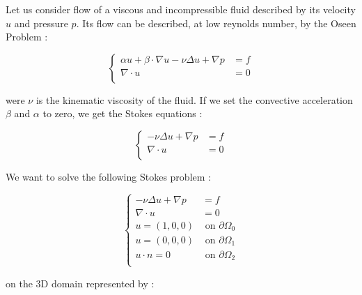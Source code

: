 %
%
%
%
%


Let us consider flow of a viscous and incompressible fluid described by its velocity $u$
and pressure $p$. Its flow can be described, at low reynolds number, by the Oseen Problem :

\begin{equation} \label{eqn-oseen}
\left\{
\begin{array}{lc}
\displaystyle \alpha u + \beta \cdot \nabla u - \nu \Delta u +
\nabla p & = f \\
\displaystyle \nabla \cdot u & = 0  \\
\end{array}
\right.
\end{equation}

were $\nu$ is the kinematic viscosity of the fluid. If we set the convective
acceleration $\beta$ and $\alpha$ to zero, we get the Stokes equations
 :

\begin{equation} \label{eqn-stokes}
\left\{
\begin{array}{lc}
- \nu \Delta u+
\nabla p & = f \\
\displaystyle \nabla \cdot u & = 0  \\
\end{array}
\right.
\end{equation}

We want to solve the following Stokes problem :

\begin{equation} \label{eqn-stokes}
\left\{
\begin{array}{lc}
\displaystyle - \nu \Delta u+
\nabla p & = f \\
\displaystyle \nabla \cdot u & = 0  \\
u = (1, 0, 0) & \mbox{ on } \partial \Omega_0 \\
u = (0, 0, 0) & \mbox{ on } \partial \Omega_1  \\
u \cdot n = 0 & \mbox { on } \partial \Omega_2\\
\end{array}
\right.
\end{equation}

on the 3D domain represented by :

\vspace{0.5cm}
\begin{center}

\end{center}
\vspace{0.5cm}

